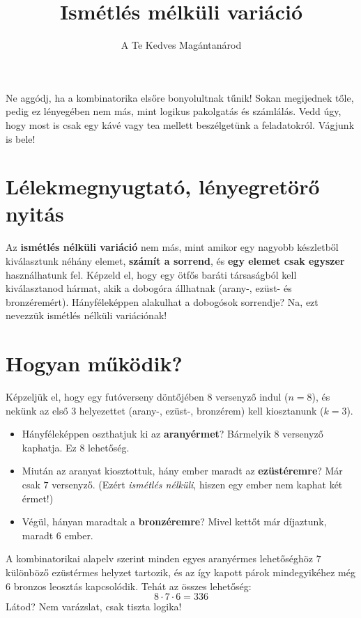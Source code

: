 \documentclass[11pt,a4paper]{article}
\title{Ismétlés mélküli variáció}
\author{A Te Kedves Magántanárod}
\date{}
\begin{document}
\maketitle

\begin{tcolorbox}[colback=mysecondary,colframe=myprimary,arc=4pt,title=\textbf{Üdvözöllek, Kedves Diákum!}]
Ne aggódj, ha a kombinatorika elsőre bonyolultnak tűnik! Sokan megijednek tőle, pedig ez lényegében nem más, mint logikus pakolgatás és számlálás. Vedd úgy, hogy most is csak egy kávé vagy tea mellett beszélgetünk a feladatokról. Vágjunk is bele!
\end{tcolorbox}

\section{Lélekmegnyugtató, lényegretörő nyitás}
Az \textbf{ismétlés nélküli variáció} nem más, mint amikor egy nagyobb készletből kiválasztunk néhány elemet, \textbf{számít a sorrend}, és \textbf{egy elemet csak egyszer} használhatunk fel. Képzeld el, hogy egy ötfős baráti társaságból kell kiválasztanod hármat, akik a dobogóra állhatnak (arany-, ezüst- és bronzéremért). Hányféleképpen alakulhat a dobogósok sorrendje? Na, ezt nevezzük ismétlés nélküli variációnak!

\section{Hogyan működik?}
Képzeljük el, hogy egy futóverseny döntőjében 8 versenyző indul ($n = 8$), és nekünk az első 3 helyezettet (arany-, ezüst-, bronzérem) kell kiosztanunk ($k = 3$). 

\begin{itemize}
    \item Hányféleképpen oszthatjuk ki az \textbf{aranyérmet}? Bármelyik 8 versenyző kaphatja. Ez $8$ lehetőség.
    \item Miután az aranyat kiosztottuk, hány ember maradt az \textbf{ezüstéremre}? Már csak $7$ versenyző. (Ezért \emph{ismétlés nélküli}, hiszen egy ember nem kaphat két érmet!)
    \item Végül, hányan maradtak a \textbf{bronzéremre}? Mivel kettőt már díjaztunk, maradt $6$ ember.
\end{itemize}

A kombinatorikai alapelv szerint minden egyes aranyérmes lehetőséghöz $7$ különböző ezüstérmes helyzet tartozik, és az így kapott párok mindegyikéhez még $6$ bronzos leosztás kapcsolódik. Tehát az összes lehetőség:
\[ 8 \cdot 7 \cdot 6 = 336 \]
Látod? Nem varázslat, csak tiszta logika!
\end{document}
